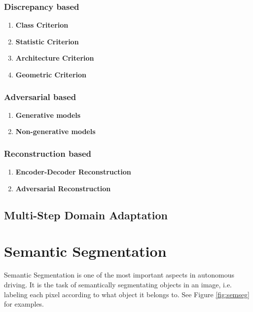 \subsubsection{Discrepancy based}
\begin{enumerate}
	\item \textbf{Class Criterion}
	\item \textbf{Statistic Criterion}
	\item \textbf{Architecture Criterion}
	\item \textbf{Geometric Criterion}
\end{enumerate}

\subsubsection{Adversarial based}
\begin{enumerate}
	\item \textbf{Generative models}
	\item \textbf{Non-generative models}
\end{enumerate}

\subsubsection{Reconstruction based}
\begin{enumerate}
	\item \textbf{Encoder-Decoder Reconstruction}
	\item \textbf{Adversarial Reconstruction}
\end{enumerate}

\subsection{Multi-Step Domain Adaptation}


\section{Semantic Segmentation}
Semantic Segmentation is one of the most important aspects in autonomous driving. It is the task of semantically segmentating objects in an image, i.e. labeling each pixel according to what object it belongs to. See Figure \ref{fig:semseg} for examples.

